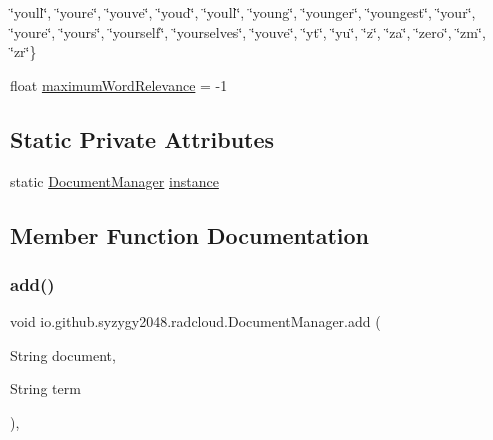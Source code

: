 \begin{DoxyCompactItemize}
$$\char`\"{}you\textquotesingle{}ll\char`\"{}, \char`\"{}you\textquotesingle{}re\char`\"{}, \char`\"{}you\textquotesingle{}ve\char`\"{}, \char`\"{}youd\char`\"{}, \char`\"{}youll\char`\"{}, \char`\"{}young\char`\"{}, \char`\"{}younger\char`\"{}, \char`\"{}youngest\char`\"{}, \char`\"{}your\char`\"{}, \char`\"{}youre\char`\"{}, \char`\"{}yours\char`\"{}, \char`\"{}yourself\char`\"{}, \char`\"{}yourselves\char`\"{}, \char`\"{}youve\char`\"{}, \char`\"{}yt\char`\"{}, \char`\"{}yu\char`\"{}, \char`\"{}z\char`\"{}, \char`\"{}za\char`\"{}, \char`\"{}zero\char`\"{}, \char`\"{}zm\char`\"{}, \char`\"{}zr\char`\"{}\}
\item 
float \mbox{\hyperlink{classio_1_1github_1_1syzygy2048_1_1radcloud_1_1_document_manager_aa916c7fc8adbcf354f6de176ce956d9b}{maximum\+Word\+Relevance}} = -\/1
\end{DoxyCompactItemize}
\subsection*{Static Private Attributes}
\begin{DoxyCompactItemize}
\item 
static \mbox{\hyperlink{classio_1_1github_1_1syzygy2048_1_1radcloud_1_1_document_manager}{Document\+Manager}} \mbox{\hyperlink{classio_1_1github_1_1syzygy2048_1_1radcloud_1_1_document_manager_abf666eb397787cf4d1fae50844f920a9}{instance}}
\end{DoxyCompactItemize}


\subsection{Member Function Documentation}
\mbox{\label{classio_1_1github_1_1syzygy2048_1_1radcloud_1_1_document_manager_aecdf1d11ec1b9a2db9cdb0f60b1c1184}} 
\subsubsection{\texorpdfstring{add()}{add()}}
{\footnotesize\ttfamily void io.\+github.\+syzygy2048.\+radcloud.\+Document\+Manager.\+add (\begin{DoxyParamCaption}\item[{String}]{document,  }\item[{String}]{term }\end{DoxyParamCaption})\hspace{0.3cm}{\ttfamily [inline]}, {\ttfamily [private]}}

